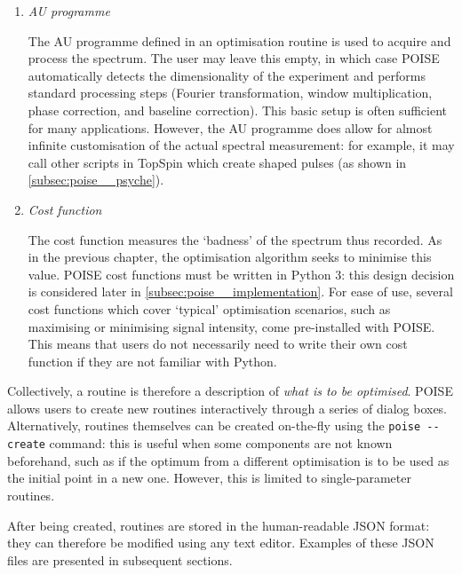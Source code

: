 \begin{enumerate}
    \item \textit{AU programme}

        The AU programme defined in an optimisation routine is used to acquire and process the spectrum.
        The user may leave this empty, in which case POISE automatically detects the dimensionality of the experiment and performs standard processing steps (Fourier transformation, window multiplication, phase correction, and baseline correction).
        This basic setup is often sufficient for many applications.
        However, the AU programme does allow for almost infinite customisation of the actual spectral measurement: for example, it may call other scripts in TopSpin which create shaped pulses (as shown in \cref{subsec:poise__psyche}).

    \item \textit{Cost function}

        The cost function measures the `badness' of the spectrum thus recorded.
        As in the previous chapter, the optimisation algorithm seeks to minimise this value.
        POISE cost functions must be written in Python 3: this design decision is considered later in \cref{subsec:poise__implementation}.
        For ease of use, several cost functions which cover `typical' optimisation scenarios, such as maximising or minimising signal intensity, come pre-installed with POISE.
        This means that users do not necessarily need to write their own cost function if they are not familiar with Python.
\end{enumerate}

Collectively, a routine is therefore a description of \textit{what is to be optimised}.
POISE allows users to create new routines interactively through a series of dialog boxes.
Alternatively, routines themselves can be created on-the-fly using the \texttt{poise -\phantom{}-create} command: this is useful when some components are not known beforehand, such as if the optimum from a different optimisation is to be used as the initial point in a new one.
However, this is limited to single-parameter routines.

After being created, routines are stored in the human-readable JSON format: they can therefore be modified using any text editor.
Examples of these JSON files are presented in subsequent sections.
